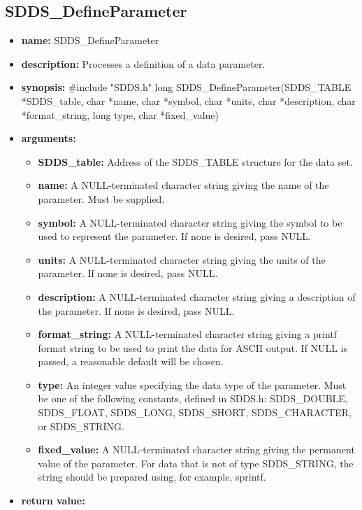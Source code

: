 \documentclass[11pt]{article}
\begin{document}
\subsection{SDDS\_DefineParameter}
\label{SDDS_DefineParameter}

\begin{itemize}
\item {\bf name:}\newline
SDDS\_DefineParameter
\item {\bf description:}\newline
Processes a definition of a data parameter.
\item {\bf synopsis:} \#include "SDDS.h"\newline
long SDDS\_DefineParameter(SDDS\_TABLE *SDDS\_table, char *name, char *symbol, char *units, char *description, char *format\_string, long type, char *fixed\_value)
\item {\bf arguments:}
\begin{itemize}
\item {\bf SDDS\_table:} Address of the SDDS\_TABLE structure for the data set.
\item {\bf name:} A NULL-terminated character string giving the name of the parameter. Must be supplied.
\item {\bf symbol:} A NULL-terminated character string giving the symbol to be used to represent the parameter. If none is desired, pass NULL.
\item {\bf units:} A NULL-terminated character string giving the units of the parameter. If none is desired, pass NULL.
\item {\bf description:} A NULL-terminated character string giving a description of the parameter. If none is desired, pass NULL.
\item {\bf format\_string:} A NULL-terminated character string giving a  printf format string to be used to print the data for ASCII output. If NULL is passed, a reasonable default will be chosen.
\item {\bf type:} An integer value specifying the data type of the parameter. Must be one of the following constants, defined in  SDDS.h: SDDS\_DOUBLE, SDDS\_FLOAT, SDDS\_LONG, SDDS\_SHORT, SDDS\_CHARACTER, or SDDS\_STRING.
\item {\bf fixed\_value:} A NULL-terminated character string giving the permanent value of the parameter. For data that is not of type SDDS\_STRING, the string should be prepared using, for example, sprintf.
\end{itemize}
\item {\bf return value:}\newline

\end{itemize}
\end{document}
